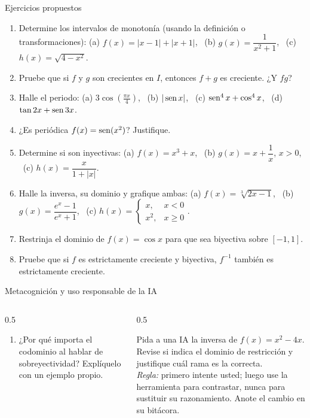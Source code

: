 \documentclass[10pt,aspectratio=169]{beamer}
\begin{document}
\begin{frame}{Ejercicios propuestos}
  \small
  \begin{ejercicio}
    \begin{enumerate}
      \item Determine los intervalos de monotonía (usando la definición o transformaciones): (a) $f(x)=|x-1|+|x+1|$,
        \ (b) $g(x)=\dfrac{1}{x^2+1}$, \ (c) $h(x)=\sqrt{4-x^2}$.
      \item Pruebe que si $f$ y $g$ son crecientes en $I$, entonces $f+g$ es creciente. ¿Y $fg$?
      \item Halle el periodo: (a) $3\cos\left(\frac{\pi x}{4}\right)$, \ (b) $|\operatorname{sen} x|$, \ (c) $\operatorname{sen}^4x+\cos^4x$, \ (d) $\tan2x+\operatorname{sen}3x$.
      \item ¿Es periódica $f(x)=\operatorname{sen}(x^2)$? Justifique.
      \item Determine si son inyectivas: (a) $f(x)=x^3+x$, \ (b) $g(x)=x+\dfrac1x$, $x>0$, \ (c) $h(x)=\dfrac{x}{1+|x|}$.
      \item Halle la inversa, su dominio y grafique ambas: (a) $f(x)=\sqrt[3]{2x-1}$, \ (b) $g(x)=\dfrac{e^x-1}{e^x+1}$,
        \ (c) $h(x)=\begin{cases}x,&x<0\\ x^2,&x\ge0\end{cases}$.
      \item Restrinja el dominio de $f(x)=\cos x$ para que sea biyectiva sobre $[-1,1]$.
      \item Pruebe que si $f$ es estrictamente creciente y biyectiva, $f^{-1}$ también es estrictamente creciente.
    \end{enumerate}
  \end{ejercicio}
\end{frame}

\begin{frame}{Metacognición y uso responsable de la IA}
  \small
  \begin{columns}[t]
    \begin{column}{0.5\textwidth}
      \begin{metacog}
        \begin{enumerate}
          \metacomun
          \item ¿Por qué importa el codominio al hablar de sobreyectividad? Explíquelo con un ejemplo propio.
        \end{enumerate}
      \end{metacog}
    \end{column}
    \begin{column}{0.5\textwidth}
      \begin{iabox}
        Pida a una IA la inversa de $f(x)=x^2-4x$. Revise si indica el dominio de restricción y justifique cuál rama es la correcta.\\[2pt]
        \textit{Regla:} primero intente usted; luego use la herramienta para contrastar, nunca para sustituir su razonamiento. Anote el cambio en su bitácora.
      \end{iabox}
    \end{column}
  \end{columns}
\end{frame}
\end{document}
